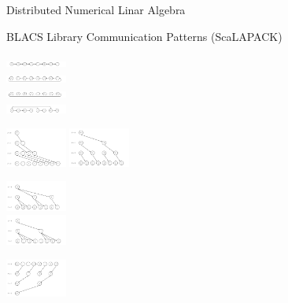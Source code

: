 \begin{frame}{Distributed Numerical Linar Algebra}
  \begin{block}{BLACS Library Communication Patterns (ScaLAPACK)}
    \begin{minipage}{1.8cm}\vspace{-1cm}
      \includegraphics[width=2cm]{../common/pics/comm/BLACS01.png} \\[-1ex]
      \includegraphics[width=2cm]{../common/pics/comm/BLACS02.png} \\[-1ex]
      \includegraphics[width=2cm]{../common/pics/comm/BLACS03.png} \\[-.3ex]
      \includegraphics[width=2cm]{../common/pics/comm/BLACS04.png}
    \end{minipage}
    \includegraphics[width=2cm]{../common/pics/comm/BLACS05.png}
    \includegraphics[width=2cm]{../common/pics/comm/BLACS06.png}
    \begin{minipage}{1.8cm}\vspace{-.5cm}
      \includegraphics[width=2cm]{../common/pics/comm/BLACS07.png} \\
      \includegraphics[width=2cm]{../common/pics/comm/BLACS08.png}
    \end{minipage}
    \begin{minipage}{1.9cm}\vspace{-.1cm}
      \includegraphics[width=2cm]{../common/pics/comm/BLACS09.png} \\

\end{minipage}
\end{block}
\end{frame}
